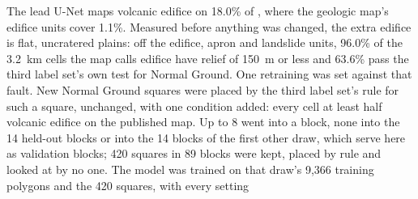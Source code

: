 The lead U-Net maps volcanic edifice on 18.0\% of \pmsixty, where the geologic map's edifice units cover 1.1\%. Measured
before anything was changed, the extra edifice is flat, uncratered plains: off the edifice, apron and landslide units,
96.0\% of the 3.2~km cells the map calls edifice have relief of 150~m or less and 63.6\% pass the third label set's own
test for Normal Ground. One retraining was set against that fault. New Normal Ground squares were placed by the third
label set's rule for such a square, unchanged, with one condition added: every cell at least half volcanic edifice on
the published map. Up to 8 went into a block, none into the 14 held-out blocks or into the 14 blocks of the first
other draw, which serve here as validation blocks; 420 squares in 89 blocks were kept, placed by rule and looked at by
no one. The model was trained on that draw's 9,366 training polygons and the 420 squares, with every setting
